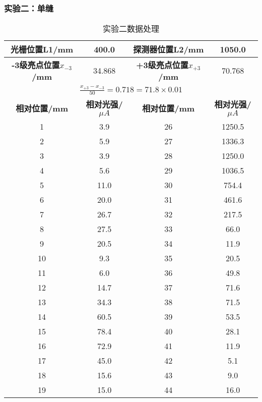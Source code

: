 \documentclass[]{../模板/Report}%
\begin{document}
\begin{fullreportonly}
\subsubsection{实验二：单缝}
\begin{table}[H]
    \centering
    \caption{实验二数据处理}
    \begin{tabular}{|c|c|c|c|}
        \hline
        \textbf{光栅位置L1/mm} & 400.0 & \textbf{探测器位置L2/mm} & 1050.0  \\
        \hline
        \textbf{-3级亮点位置$x_{-3}$/mm} & 34.868 & \textbf{+3级亮点位置$x_{+3}$/mm} & 70.768  \\
        \hline
        \multicolumn{4}{|c|}{$ \frac{x_{+3} - x_{-3}}{50} = 0.718 = 71.8 \times 0.01$}  \\
        \hline
        \textbf{相对位置/mm} & \textbf{相对光强/$\mu A$} & \textbf{相对位置/mm} & \textbf{相对光强/$\mu A$}  \\
        \hline
        1 & 3.9 & 26 & 1250.5  \\
        \hline
        2 & 5.9 & 27 & 1336.3  \\
        \hline
        3 & 3.9 & 28 & 1250.0  \\
        \hline
        4 & 5.6 & 29 & 1036.5  \\
        \hline
        5 & 11.0 & 30 & 754.4  \\
        \hline
        6 & 20.0 & 31 & 461.6  \\
        \hline
        7 & 26.7 & 32 & 217.5  \\
        \hline
        8 & 27.5 & 33 & 66.0  \\
        \hline
        9 & 20.5 & 34 & 11.9  \\
        \hline
        10 & 9.3 & 35 & 20.5  \\
        \hline
        11 & 6.0 & 36 & 49.8  \\
        \hline
        12 & 14.7 & 37 & 71.6  \\
        \hline 
        13 & 34.3 & 38 & 71.5  \\
        \hline
        14 & 60.5 & 39 & 53.5  \\
        \hline
        15 & 78.4 & 40 & 28.1  \\
        \hline
        16 & 72.9 & 41 & 11.9  \\
        \hline
        17 & 45.0 & 42 & 5.1  \\
        \hline
        18 & 15.6 & 43 & 9.0  \\
        \hline
        19 & 15.0 & 44 & 16.0  \\

\end{tabular}
\end{table}
\end{fullreportonly}
\end{document}
